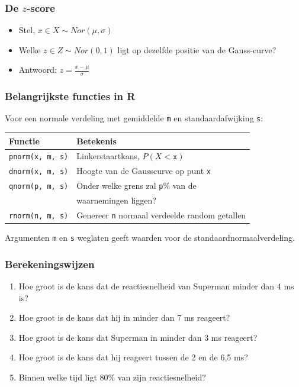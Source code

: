 \documentclass{beamer}
\begin{document}
\begin{frame}
  \frametitle{De $z$-score}
  
  \begin{itemize}
    \item Stel, $x \in X \sim Nor(\mu, \sigma)$
    \item Welke $z \in Z \sim Nor(0, 1)$ ligt op dezelfde positie van de Gauss-curve?
    \pause
    \item Antwoord: $z = \frac{x - \mu}{\sigma}$
  \end{itemize}
  
\end{frame}

\begin{frame}[fragile]
  \frametitle{Belangrijkste functies in R}
  
  Voor een normale verdeling met gemiddelde \texttt{m} en standaardafwijking \texttt{s}:
  \vfill
  \centering
  \begin{tabular}{ll}
  	\textbf{Functie}      & \textbf{Betekenis}                          \\ \hline
  	\verb|pnorm(x, m, s)| & Linkerstaartkans, $P(X<\mathtt{x})$         \\
  	\verb|dnorm(x, m, s)| & Hoogte van de Gausscurve op punt \texttt{x} \\
  	\verb|qnorm(p, m, s)| & Onder welke grens zal \texttt{p}\% van de   \\
  	                      & waarnemingen liggen?                        \\
  	\verb|rnorm(n, m, s)| & Genereer \texttt{n} normaal verdeelde random getallen
  \end{tabular}
  \vfill
  Argumenten \texttt{m} en \texttt{s} weglaten geeft waarden voor de standaardnormaalverdeling.
\end{frame}

\begin{frame}
  \frametitle{Berekeningswijzen}

  \begin{enumerate}
    \item Hoe groot is de kans dat de reactiesnelheid van Superman minder dan 4 ms is?
    \item Hoe groot is de kans dat hij in minder dan 7 ms reageert?
    \item Hoe groot is de kans dat Superman in minder dan 3 ms reageert?
    \item Hoe groot is de kans dat hij reageert tussen de 2 en de 6,5 ms?
    \item Binnen welke tijd ligt 80\% van zijn reactiesnelheid?
  \end{enumerate}
\end{frame}
\end{document}
